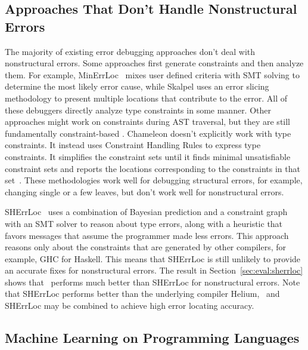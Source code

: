 \documentclass[12pt]{report}	%
\begin{document}
\subsection{Approaches That Don't Handle Nonstructural Errors}

The majority of existing error debugging approaches don't
deal with nonstructural errors. Some approaches first generate
constraints and then analyze them. For example, MinErrLoc~\cite{Pavlinovic14:FMT,Pavlinovic15:PST} mixes
user defined criteria with SMT solving to determine the most likely error cause, while
Skalpel \cite{Haack03:TES}
uses an error slicing methodology to present multiple locations that contribute to
the error. All of these debuggers directly analyze type constraints in some manner.
%
Other approaches
might work on constraints during AST traversal, but they are still fundamentally constraint-based
\cite{Lee98:PAF,Lee00:GLP,McAdam02:RTE,Yang00:ETE,Wand86:FST,Duggan95:ETI,Chitil01:CET}.
Chameleon doesn't explicitly work with type constraints. It instead uses
Constraint Handling Rules to express type constraints. It simplifies
the constraint sets until it finds
minimal unsatisfiable constraint sets and reports the locations corresponding to the
constraints in that set~\cite{Stuckey03:ITD,Stuckey04:ITE,Wazny06:TIT}.
These methodologies work well for debugging structural errors, for example, changing
single or a few leaves, but don't work well for nonstructural errors.


SHErrLoc~\cite{Zhang15:DTE}  uses a combination of Bayesian prediction and
a constraint graph with an SMT solver to reason about type errors,
along with a heuristic
that favors messages that assume the programmer made less errors.
%
This approach reasons only about the constraints that are generated by
other compilers, for example, GHC for Haskell.
This means that SHErrLoc is still unlikely
to provide an accurate fixes for nonstructural errors.
The result in Section~\ref{sec:eval:sherrloc} shows that \newCompiler\
performs much better than SHErrLoc for nonstructural errors.
Note that SHErrLoc performs better than the underlying compiler Helium,
\newCompiler\ and SHErrLoc may be combined 
to achieve high error locating accuracy.

\subsection{Machine Learning on Programming Languages}
\end{document}
